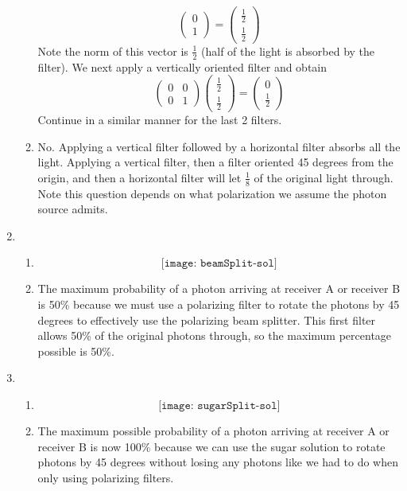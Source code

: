 \documentclass[12pt]{article}
\begin{document}
\begin{enumerate}[font=\bfseries]
\begin{enumerate}
\[                \begin{pmatrix} 0 \\ 1 \end{pmatrix}
                =
                \begin{pmatrix} \frac{1}{2} \\ \frac{1}{2} \end{pmatrix}
                \]
            Note the norm of this vector is $\frac{1}{2}$ (half of the light is absorbed by the filter). We next apply a vertically oriented filter and obtain
            \[\begin{pmatrix}
                0 & 0 \\
                0 & 1
                \end{pmatrix}
                \begin{pmatrix}
                \frac{1}{2} \\ \frac{1}{2}
                \end{pmatrix}
                =
                \begin{pmatrix} 0 \\ \frac{1}{2} \end{pmatrix}
                \]
            Continue in a similar manner for the last 2 filters.
            \item No. Applying a vertical filter followed by a horizontal filter absorbs all the light. Applying a vertical filter, then a filter oriented 45 degrees from the origin, and then a horizontal filter will let $\frac{1}{8}$ of the original light through. Note this question depends on what polarization we assume the photon source admits. 
    \end{enumerate}
    \item \begin{enumerate}
        \item \[\texttt{[image: beamSplit-sol]}\]
        \item The maximum probability of a photon arriving at receiver A or receiver B is 50\% because we must use a polarizing filter to rotate the photons by 45 degrees to effectively use the polarizing beam splitter. This first filter allows 50\% of the original photons through, so the maximum percentage possible is 50\%.
    \end{enumerate}
    \item \begin{enumerate}
        \item \[\texttt{[image: sugarSplit-sol]}\]
        \item The maximum possible probability of a photon arriving at receiver A or receiver B is now 100\% because we can use the sugar solution to rotate photons by 45 degrees without losing any photons like we had to do when only using polarizing filters.

\end{enumerate}
\end{enumerate}
\end{document}

